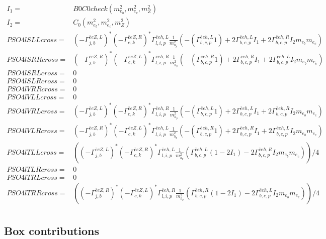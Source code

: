 \documentclass[A4,landscape]{article}
\begin{document}
\begin{align} 
I_1= & B0C0check(m^2_{e_{{b}}}, m^2_{e_{{c}}}, m^2_{Z}) \\ 
I_2= & C_0(m^2_{e_{{b}}}, m^2_{e_{{c}}}, m^2_{Z}) \\ 
  PSO4lSLLcross= &  (- \Gamma^{\bar{e}e Z ,L} _{j, b})^* (- \Gamma^{\bar{e}e Z ,R} _{c, k})^* \Gamma^{\bar{e}e h ,L}_{l, i, p} \frac{1}{m^2_{h_{{p}}}} (-(\Gamma^{\bar{e}e h ,L}_{b, c, p} 1) + 2 \Gamma^{\bar{e}e h ,L}_{b, c, p} I_1 + 2 \Gamma^{\bar{e}e h ,R}_{b, c, p} I_2 m_{e_{{b}}} m_{e_{{c}}}) \\ 
  PSO4lSRRcross= &  (- \Gamma^{\bar{e}e Z ,R} _{j, b})^* (- \Gamma^{\bar{e}e Z ,L} _{c, k})^* \Gamma^{\bar{e}e h ,R}_{l, i, p} \frac{1}{m^2_{h_{{p}}}} (-(\Gamma^{\bar{e}e h ,R}_{b, c, p} 1) + 2 \Gamma^{\bar{e}e h ,R}_{b, c, p} I_1 + 2 \Gamma^{\bar{e}e h ,L}_{b, c, p} I_2 m_{e_{{b}}} m_{e_{{c}}}) \\ 
  PSO4lSRLcross= & 0 \\ 
  PSO4lSLRcross= & 0 \\ 
  PSO4lVRRcross= & 0 \\ 
  PSO4lVLLcross= & 0 \\ 
  PSO4lVRLcross= &  (- \Gamma^{\bar{e}e Z ,L} _{j, b})^* (- \Gamma^{\bar{e}e Z ,R} _{c, k})^* \Gamma^{\bar{e}e h ,R}_{l, i, p} \frac{1}{m^2_{h_{{p}}}} (-(\Gamma^{\bar{e}e h ,L}_{b, c, p} 1) + 2 \Gamma^{\bar{e}e h ,L}_{b, c, p} I_1 + 2 \Gamma^{\bar{e}e h ,R}_{b, c, p} I_2 m_{e_{{b}}} m_{e_{{c}}}) \\ 
  PSO4lVLRcross= &  (- \Gamma^{\bar{e}e Z ,R} _{j, b})^* (- \Gamma^{\bar{e}e Z ,L} _{c, k})^* \Gamma^{\bar{e}e h ,L}_{l, i, p} \frac{1}{m^2_{h_{{p}}}} (-(\Gamma^{\bar{e}e h ,R}_{b, c, p} 1) + 2 \Gamma^{\bar{e}e h ,R}_{b, c, p} I_1 + 2 \Gamma^{\bar{e}e h ,L}_{b, c, p} I_2 m_{e_{{b}}} m_{e_{{c}}}) \\ 
  PSO4lTLLcross= & ( (- \Gamma^{\bar{e}e Z ,L} _{j, b})^* (- \Gamma^{\bar{e}e Z ,R} _{c, k})^* \Gamma^{\bar{e}e h ,L}_{l, i, p} \frac{1}{m^2_{h_{{p}}}} (\Gamma^{\bar{e}e h ,L}_{b, c, p} (1 - 2 I_1) - 2 \Gamma^{\bar{e}e h ,R}_{b, c, p} I_2 m_{e_{{b}}} m_{e_{{c}}}))/4 \\ 
  PSO4lTLRcross= & 0 \\ 
  PSO4lTRLcross= & 0 \\ 
  PSO4lTRRcross= & ( (- \Gamma^{\bar{e}e Z ,R} _{j, b})^* (- \Gamma^{\bar{e}e Z ,L} _{c, k})^* \Gamma^{\bar{e}e h ,R}_{l, i, p} \frac{1}{m^2_{h_{{p}}}} (\Gamma^{\bar{e}e h ,R}_{b, c, p} (1 - 2 I_1) - 2 \Gamma^{\bar{e}e h ,L}_{b, c, p} I_2 m_{e_{{b}}} m_{e_{{c}}}))/4 \\ 
\end{align} 
\subsection{Box contributions} 
\end{document}
